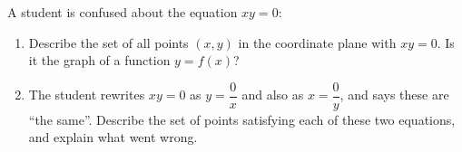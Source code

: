 A student is confused about the equation $xy=0$:
\begin{enumerate}
\item[(a)] Describe the set of all points $(x,y)$ in the coordinate plane with $xy=0$. Is it the graph of a function $y=f(x)$?
\item[(b)] The student rewrites $xy=0$ as $y=\dfrac{0}{x}$ and also as $x=\dfrac{0}{y}$, and says these are ``the same''. Describe the set of points satisfying each of these two equations, and explain what went wrong.
\end{enumerate}

